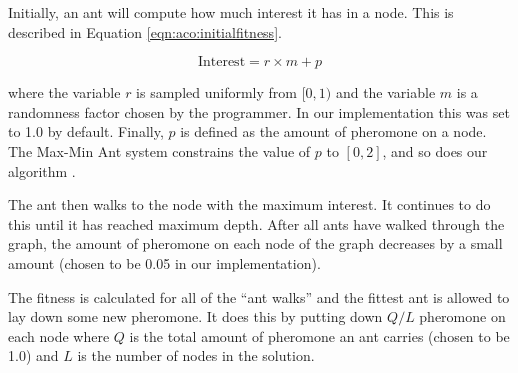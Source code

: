 Initially, an ant will compute how much interest it has in a node. This is described in Equation \ref{eqn:aco:initialfitness}.

\begin{equation}
\label{eqn:aco:initialfitness}
\text{Interest} = r \times m + p
\end{equation}

\noindent where the variable $r$ is sampled uniformly from $[0, 1)$ and the variable $m$ is a randomness factor chosen by the programmer. In our implementation this was set to 1.0 by default. Finally, $p$ is defined as the amount of pheromone on a node. The Max-Min Ant system constrains the value of $p$ to $[0, 2]$, and so does our algorithm \cite{stutzle2000max}.

The ant then walks to the node with the maximum interest. It continues to do this until it has reached maximum depth. After all ants have walked through the graph, the amount of pheromone on each node of the graph decreases by a small amount (chosen to be 0.05 in our implementation).

The fitness is calculated for all of the ``ant walks'' and the fittest ant is allowed to lay down some new pheromone. It does this by putting down $Q/L$ pheromone on each node where $Q$ is the total amount of pheromone an ant carries (chosen to be 1.0) and $L$ is the number of nodes in the solution.
